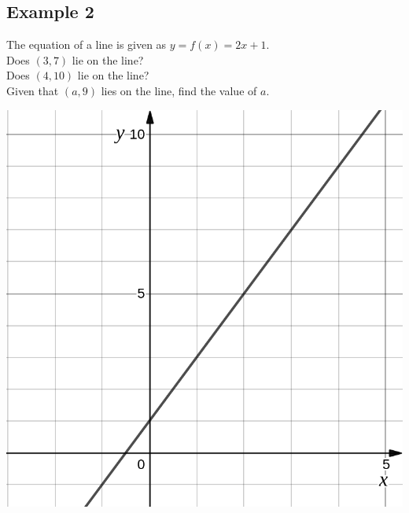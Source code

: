 \documentclass[a4paper,12pt]{article}
\begin{document}
\subsection{Example 2}
The equation of a line is given as \(y=f(x)=2x+1\).\\
Does \((3,7)\) lie on the line?\\
Does \((4,10)\) lie on the line?\\
Given that \((a,9)\) lies on the line, find the value of \(a\).
\begin{center}
\includegraphics[width=.99\textwidth]{2x+1.png}
\end{center}
\end{document}
